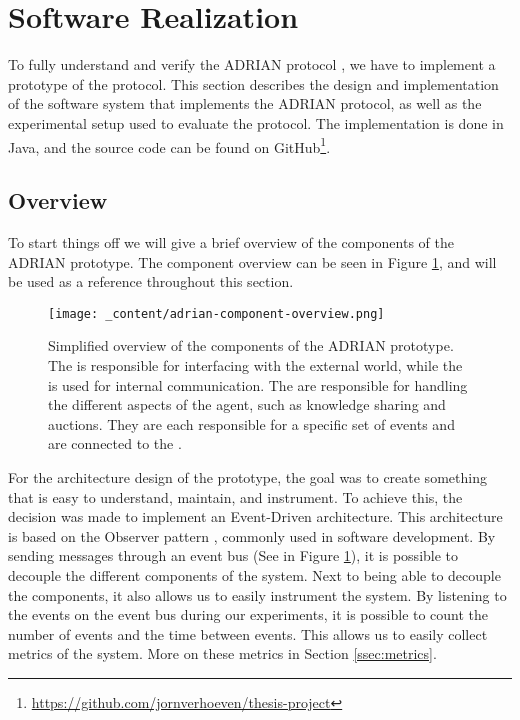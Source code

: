 \section{Software Realization}
\label{sec:software-realization}
To fully understand and verify the ADRIAN protocol \cite{mann2023ADRIAN}, we have to implement a prototype of the protocol. This section describes the design and implementation of the software system that implements the ADRIAN protocol, as well as the experimental setup used to evaluate the protocol. The implementation is done in Java, and the source code can be found on GitHub\footnote{\url{https://github.com/jornverhoeven/thesis-project}}. 


\subsection{Overview}
\label{ssec:overview}
To start things off we will give a brief overview of the components of the ADRIAN prototype. The component overview can be seen in Figure \ref{fig:adrian-component-overview}, and will be used as a reference throughout this section.

\begin{figure}[H]
    \centering
    \texttt{[image: \_content/adrian-component-overview.png]}
    \caption{Simplified overview of the components of the ADRIAN prototype. The  is responsible for interfacing with the external world, while the  is used for internal communication. The  are responsible for handling the different aspects of the agent, such as knowledge sharing and auctions. They are each responsible for a specific set of events and are connected to the .}
    \label{fig:adrian-component-overview}
\end{figure}

For the architecture design of the prototype, the goal was to create something that is easy to understand, maintain, and instrument. To achieve this, the decision was made to implement an Event-Driven architecture. This architecture is based on the Observer pattern \cite{gamma1995design}, commonly used in software development. By sending messages through an event bus (See  in Figure \ref{fig:adrian-component-overview}), it is possible to decouple the different components of the system. Next to being able to decouple the components, it also allows us to easily instrument the system. By listening to the events on the event bus during our experiments, it is possible to count the number of events and the time between events. This allows us to easily collect metrics of the system. More on these metrics in Section \ref{ssec:metrics}.

